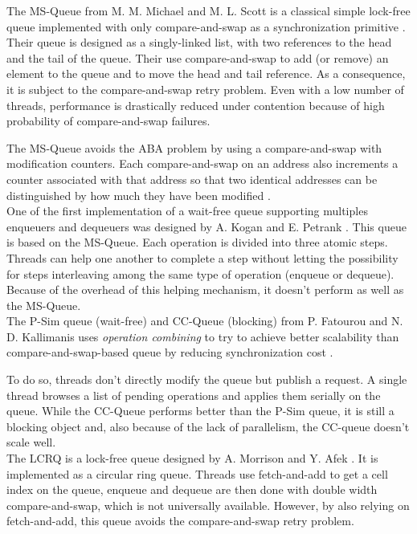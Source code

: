  The MS-Queue from M. M. Michael and M. L. Scott is a classical
simple lock-free queue implemented with only compare-and-swap as a
synchronization primitive \cite{Michael96simple}. Their queue is designed as a
singly-linked list, with two references to the head and the tail of the queue.
Their use compare-and-swap to add (or remove) an element to the queue and to
move the head and tail reference. As a consequence, it is subject to the
compare-and-swap retry problem. Even with a low number of threads, performance
is drastically reduced under contention because of high probability of
compare-and-swap failures.

The MS-Queue avoids the ABA problem by using a compare-and-swap with
modification counters. Each compare-and-swap on an address also increments a
counter associated with that address so that two identical addresses can be
distinguished by how much they have been modified \cite{Herlihy08}
\cite{Michael96simple}. \\

 One of the first implementation of a wait-free
queue supporting multiples enqueuers and dequeuers was designed by A. Kogan and
E. Petrank \cite{Kogan:2011:WQM:2038037.1941585}. This queue is based on the
MS-Queue. Each operation is divided into three atomic steps. Threads can help
one another to complete a step without letting the possibility for steps
interleaving among the same type of operation (enqueue or dequeue). Because of
the overhead of this helping mechanism, it doesn't perform as well as the
MS-Queue. \\

 The P-Sim queue (wait-free) and CC-Queue (blocking)
from P. Fatourou and N. D. Kallimanis uses \textit{operation combining} to try
to achieve better scalability than compare-and-swap-based queue by reducing
synchronization cost \cite{Fatourou:2011:HWU:1989493.1989549}
\cite{Fatourou:2012:RCS:2370036.2145849}.

To do so, threads don't directly modify the queue but publish a request. A
single thread browses a list of pending operations and applies them serially on
the queue. While the CC-Queue performs better than the P-Sim queue, it is still
a blocking object and, also because of the lack of parallelism, the CC-queue
doesn't scale well. \\

 The LCRQ is a lock-free queue designed by A. Morrison
and Y. Afek \cite{Morrison:2013:FCQ:2517327.2442527}. It is implemented as a
circular ring queue. Threads use fetch-and-add to get a cell index on the queue,
enqueue and dequeue are then done with double width compare-and-swap, which is
not universally available. However, by also relying on fetch-and-add, this queue
avoids the compare-and-swap retry problem. \\


